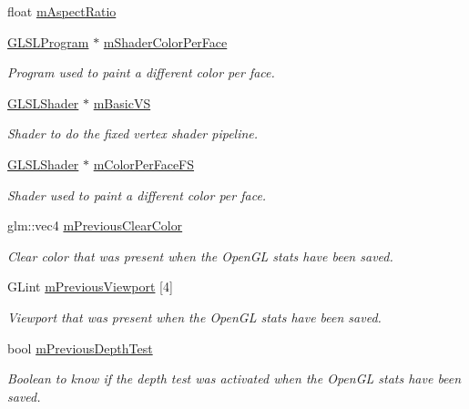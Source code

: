 \begin{DoxyCompactItemize}
\item 
float \hyperlink{class_scene_information_builder_ad4936de007fbbf36d4168fadcd38c951}{m\+Aspect\+Ratio}
\item 
\hyperlink{class_g_l_s_l_program}{G\+L\+S\+L\+Program} $\ast$ \hyperlink{class_scene_information_builder_a2139e1f25117b9fbcc31e95fb606c6be}{m\+Shader\+Color\+Per\+Face}
\begin{DoxyCompactList}\small\item\em Program used to paint a different color per face. \end{DoxyCompactList}\item 
\hyperlink{class_g_l_s_l_shader}{G\+L\+S\+L\+Shader} $\ast$ \hyperlink{class_scene_information_builder_a1d421b2913eb5f25e5c07d6813218471}{m\+Basic\+V\+S}
\begin{DoxyCompactList}\small\item\em Shader to do the fixed vertex shader pipeline. \end{DoxyCompactList}\item 
\hyperlink{class_g_l_s_l_shader}{G\+L\+S\+L\+Shader} $\ast$ \hyperlink{class_scene_information_builder_a205c12755edde1932e68bae0e22535f1}{m\+Color\+Per\+Face\+F\+S}
\begin{DoxyCompactList}\small\item\em Shader used to paint a different color per face. \end{DoxyCompactList}\item 
glm\+::vec4 \hyperlink{class_scene_information_builder_afff100c33a051ac01f73a739abd2314e}{m\+Previous\+Clear\+Color}
\begin{DoxyCompactList}\small\item\em Clear color that was present when the Open\+G\+L stats have been saved. \end{DoxyCompactList}\item 
G\+Lint \hyperlink{class_scene_information_builder_a72b702fa23072e9b080442cf8b135528}{m\+Previous\+Viewport} \mbox{[}4\mbox{]}
\begin{DoxyCompactList}\small\item\em Viewport that was present when the Open\+G\+L stats have been saved. \end{DoxyCompactList}\item 
bool \hyperlink{class_scene_information_builder_a6ae6c9855481df0c98d6d06d71a20a25}{m\+Previous\+Depth\+Test}
\begin{DoxyCompactList}\small\item\em Boolean to know if the depth test was activated when the Open\+G\+L stats have been saved. \end{DoxyCompactList}\item 

\end{DoxyCompactItemize}
